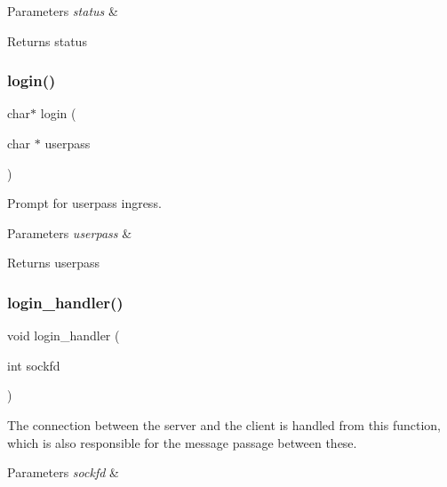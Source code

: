 \begin{DoxyParams}{Parameters}
{\em status} & \\
\hline
\end{DoxyParams}
\begin{DoxyReturn}{Returns}
status 
\end{DoxyReturn}
\mbox{\label{client_8h_a184b4ae1814dc2cdcea053bafd7f097f}} 
\subsubsection{login()}
{\footnotesize\ttfamily char$\ast$ login (\begin{DoxyParamCaption}\item[{char $\ast$}]{userpass }\end{DoxyParamCaption})}



Prompt for userpass ingress. 


\begin{DoxyParams}{Parameters}
{\em userpass} & \\
\hline
\end{DoxyParams}
\begin{DoxyReturn}{Returns}
userpass 
\end{DoxyReturn}
\mbox{\label{client_8h_a98d7f4c6baab897a754ea7a006c5cb11}} 
\subsubsection{login\+\_\+handler()}
{\footnotesize\ttfamily void login\+\_\+handler (\begin{DoxyParamCaption}\item[{int}]{sockfd }\end{DoxyParamCaption})}



The connection between the server and the client is handled from this function, which is also responsible for the message passage between these. 


\begin{DoxyParams}{Parameters}
{\em sockfd} & \\
\hline
\end{DoxyParams}
\mbox{\label{client_8h_a3f2e03899acbcffa63c626522bfb6c40}} 
